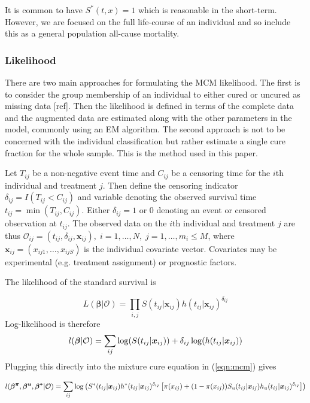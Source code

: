 \documentclass[AMA,STIX1COL]{WileyNJD-v2}
\begin{document}
It is common to have $S^*(t, x) = 1$ which is reasonable in the short-term.
However, we are focused on the full life-course of an individual and so include this as a general population all-cause mortality.


\subsubsection{Likelihood}
There are two main approaches for formulating the MCM likelihood.
The first is to consider the group membership of an individual to either cured or uncured as missing data [ref].
Then the likelihood is defined in terms of the complete data and the augmented data are estimated along with the other parameters in the model, commonly using an EM algorithm.
The second approach is not to be concerned with the individual classification but rather estimate a single cure fraction for the whole sample.
This is the method used in this paper.

Let $T_{ij}$ be a non-negative event time and $C_{ij}$ be a censoring time for the $i$th individual and treatment $j$.
Then define the censoring indicator $\delta_{ij} = I(T_{ij} < C_{ij})$ and variable denoting the observed survival time $t_{ij} = \min(T_{ij}, C_{ij})$.
Either $\delta_{ij} = 1$ or $0$ denoting an event or censored observation at $t_{ij}$.
The observed data on the $i$th individual and treatment $j$ are thus
$\mathcal{O}_{ij} = (t_{ij}, \delta_{ij}, \boldsymbol{x}_{ij}),\; i = 1, \ldots, N, \; j = 1, \ldots, m_i \leq M$,
where $\boldsymbol{x}_{ij} = (x_{ij1}, \ldots, x_{ijS})$ is the individual covariate vector.
Covariates may be experimental (e.g. treatment assignment) or prognostic factors.

The likelihood of the standard survival is

\begin{equation*}
L(\boldsymbol{\beta} | \mathcal{O}) =
\prod_{i,j} S(t_{ij} | \boldsymbol{x}_{ij}) h(t_{ij} | \boldsymbol{x}_{ij})^{\delta_{ij}}
\end{equation*}
Log-likelihood is therefore
$$
\mathnormal{l}(\boldsymbol{\beta} | \mathcal{O}) =
\sum_{ij} \log(S(t_{ij} | \boldsymbol{x}_{ij})) + \delta_{ij} \log(h(t_{ij} | \boldsymbol{x}_{ij}))
$$
Plugging this directly into the mixture cure equation in (\ref{eqn:mcm}) gives

\begin{equation}
\label{separate_lik}
\mathnormal{l}(\boldsymbol{\beta^{\pi}}, \boldsymbol{\beta^{u}}, \boldsymbol{\beta^*} | \mathcal{O}) =
\sum_{ij} \log\left( S^*(t_{ij} | \boldsymbol{x}_{ij}) h^*(t_{ij} | \boldsymbol{x}_{ij})^{\delta_{ij}} \left[\pi(x_{ij}) +
   (1 - \pi(x_{ij})) S_u(t_{ij} | \boldsymbol{x}_{ij}) h_u(t_{ij} | \boldsymbol{x}_{ij})^{\delta_{ij}} \right] \right)
\end{equation}
\end{document}
